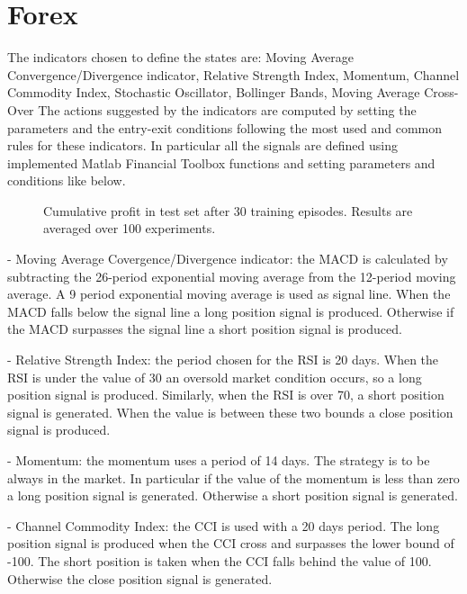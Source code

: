 \section{Forex}\label{A:Forex}
The indicators chosen to define the states are: Moving Average Convergence/Divergence indicator, Relative Strength Index, Momentum, Channel Commodity Index, Stochastic Oscillator, Bollinger Bands, Moving Average Cross-Over
The actions suggested by the indicators are computed by setting the parameters and the entry-exit conditions following the most used and common rules for these indicators.
In particular all the signals are defined using implemented Matlab Financial Toolbox functions and setting parameters and conditions like below.

\begin{figure}[t]
    \begin{minipage}{\columnwidth}
    \centering 
    \setlength\figureheight{6cm}
    \setlength\figurewidth{8cm}
    
    \caption{Cumulative profit in test set after 30 training episodes. Results are averaged over 100 experiments.}\label{F:forexCumRew}
    \end{minipage}
\end{figure}

- Moving Average Covergence/Divergence indicator:
the MACD is calculated by subtracting the 26-period exponential moving average from the 12-period moving average. A 9 period exponential moving average is used as signal line.
When the MACD falls below the signal line a long position signal is produced.
Otherwise if the MACD surpasses the signal line a short position signal is produced.

- Relative Strength Index:
the period chosen for the RSI is 20 days.
When the RSI is under the value of 30 an oversold market condition occurs, so a long position signal is produced.
Similarly, when the RSI is over 70, a short position signal is generated.
When the value is between these two bounds a close position signal is produced.

- Momentum:
the momentum uses a period of 14 days. The strategy is to be always in the market. In particular if the value of the momentum is less than zero a long position signal is generated. Otherwise  a short position signal is generated.

- Channel Commodity Index:
the CCI is used with a 20 days period. The long position signal is produced when the CCI cross and surpasses the lower bound of -100. The short position is taken when the CCI falls behind the value of 100. Otherwise the close position signal is generated.

